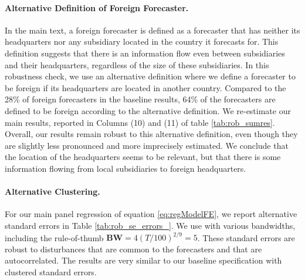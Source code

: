 \paragraph{Alternative Definition of Foreign Forecaster.} In the main text, a foreign forecaster is defined as a forecaster that has neither its headquarters nor any subsidiary located in the country it forecasts for. This definition suggests that there is an information flow even between subsidiaries and their headquarters, regardless of the size of these subsidiaries. In this robustness check, we use an alternative definition where we define a forecaster to be foreign if its headquarters are located in another country. Compared to the 28\% of foreign forecasters in the baseline results, 64\% of the forecasters are defined to be foreign according to the alternative definition. We re-estimate our main results, reported in Columns (10) and (11) of table \ref{tab:rob_sumres}. Overall, our results remain robust to this alternative definition, even though they are slightly less pronounced and more imprecisely estimated. We conclude that the location of the headquarters seems to be relevant, but that there is some information flowing from local subsidiaries to foreign headquarters.



\paragraph{Alternative Clustering.} For our main panel regression of equation \ref{eq:regModelFE}, we report alternative standard errors in Table \ref{tab:rob_se_errors_}. We use  \citet{Driscoll1998} with various bandwidths, including the rule-of-thumb $\textbf{BW} = 4(T/100)^{2/9} = 5$. These standard errors are robust to disturbances that are common to the forecasters and that are autocorrelated. The results are very similar to our baseline specification with clustered standard errors.




	\begin{landscape}%
{

}
	\end{landscape}
	\afterpage{\clearpage}








